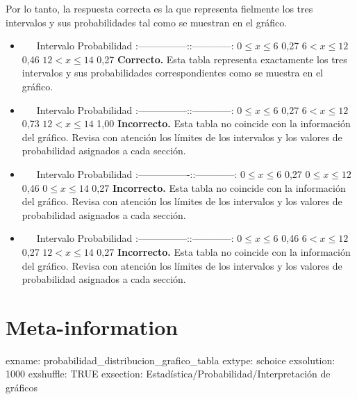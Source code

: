 \documentclass[
]{article}
\begin{document}
Por lo tanto, la respuesta correcta es la que representa fielmente los
tres intervalos y sus probabilidades tal como se muestran en el gráfico.

\begin{itemize}
\item
  ~~~Intervalo \textbar{} Probabilidad \textbar{}
  \textbar:---------------:\textbar:------------:\textbar{} \textbar{}
  \(0 \le x \le 6\) \textbar{} 0,27 \textbar{} \textbar{}
  \(6 < x \le 12\) \textbar{} 0,46 \textbar{} \textbar{}
  \(12 < x \le 14\) \textbar{} 0,27 \textbar{} \textbf{Correcto.} Esta
  tabla representa exactamente los tres intervalos y sus probabilidades
  correspondientes como se muestra en el gráfico.
\item
  ~~~Intervalo \textbar{} Probabilidad \textbar{}
  \textbar:---------------:\textbar:------------:\textbar{} \textbar{}
  \(0 \le x \le 6\) \textbar{} 0,27 \textbar{} \textbar{}
  \(6 < x \le 12\) \textbar{} 0,73 \textbar{} \textbar{}
  \(12 < x \le 14\) \textbar{} 1,00 \textbar{} \textbf{Incorrecto.} Esta
  tabla no coincide con la información del gráfico. Revisa con atención
  los límites de los intervalos y los valores de probabilidad asignados
  a cada sección.
\item
  ~~~Intervalo \textbar{} Probabilidad \textbar{}
  \textbar:----------------:\textbar:------------:\textbar{} \textbar{}
  \(0 \le x \le 6\) \textbar{} 0,27 \textbar{} \textbar{}
  \(0 \le x \le 12\) \textbar{} 0,46 \textbar{} \textbar{}
  \(0 \le x \le 14\) \textbar{} 0,27 \textbar{} \textbf{Incorrecto.}
  Esta tabla no coincide con la información del gráfico. Revisa con
  atención los límites de los intervalos y los valores de probabilidad
  asignados a cada sección.
\item
  ~~~Intervalo \textbar{} Probabilidad \textbar{}
  \textbar:---------------:\textbar:------------:\textbar{} \textbar{}
  \(0 \le x \le 6\) \textbar{} 0,46 \textbar{} \textbar{}
  \(6 < x \le 12\) \textbar{} 0,27 \textbar{} \textbar{}
  \(12 < x \le 14\) \textbar{} 0,27 \textbar{} \textbf{Incorrecto.} Esta
  tabla no coincide con la información del gráfico. Revisa con atención
  los límites de los intervalos y los valores de probabilidad asignados
  a cada sección.
\end{itemize}

\section{Meta-information}\label{meta-information}

exname: probabilidad\_distribucion\_grafico\_tabla extype: schoice
exsolution: 1000 exshuffle: TRUE exsection:
Estadística/Probabilidad/Interpretación de gráficos
\end{document}
